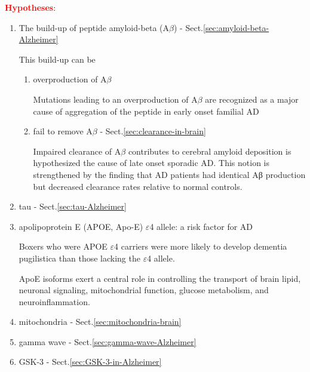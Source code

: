 \textcolor{red}{\bf Hypotheses}:
\begin{enumerate}
  \item  The build-up of peptide amyloid-beta (A$\beta$) -
  Sect.\ref{sec:amyloid-beta-Alzheimer}
  
  This build-up can be 
  \begin{enumerate}
    \item overproduction of A$\beta$
    \label{sec:Alzheimer-hypothesis-overproduction-Ab}
    
    Mutations leading to an overproduction of A$\beta$ 
    are recognized as a major cause of aggregation of the peptide in early onset familial AD

    
    \item fail to remove A$\beta$ - Sect.\ref{sec:clearance-in-brain}
    \label{sec:Alzheimer-hypothesis-impaired-clearance-Ab}
    
    Impaired clearance of A$\beta$ contributes to cerebral amyloid deposition is
    hypothesized the cause of late onset sporadic AD.
    This notion is strengthened by the finding that AD patients had identical Aβ
    production but decreased clearance rates relative to normal controls.

    
  \end{enumerate}
  
  \item tau - Sect.\ref{sec:tau-Alzheimer}
  
  \item  apolipoprotein E (APOE, Apo-E) $\varepsilon$4 allele:
   a risk factor for AD 
   
 Boxers who were APOE $\varepsilon$4 carriers were more likely to develop dementia
 pugilistica than those lacking the $\varepsilon$4 allele.
 
 ApoE isoforms exert a central role in controlling the transport of brain lipid,
 neuronal signaling, mitochondrial function, glucose metabolism, and
 neuroinflammation.
  
  \item mitochondria - Sect.\ref{sec:mitochondria-brain}
  
  \item gamma wave - Sect.\ref{sec:gamma-wave-Alzheimer}

   \item GSK-3 - Sect.\ref{sec:GSK-3-in-Alzheimer}
\end{enumerate}




